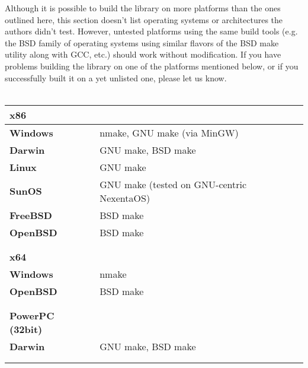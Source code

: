Although it is possible to build the  library on more platforms
than the ones outlined here, this section doesn't list operating systems or
architectures the authors didn't test. However, untested platforms using
the same build tools (e.g. the BSD family of operating systems using similar
flavors of the BSD make utility along with GCC, etc.) should work without
modification. If you have problems building the  library on one of the
platforms mentioned below, or if you successfully built it on a yet unlisted
one, please let us know.\\
\\

\begin{tabular}{l l}
{\bf{\large x86}} &                                           \\
\hline\hline
{\bf Windows}     & nmake, GNU make (via MinGW)               \\
{\bf Darwin}      & GNU make, BSD make                        \\
{\bf Linux}       & GNU make                                  \\
{\bf SunOS}       & GNU make (tested on GNU-centric NexentaOS)\\
{\bf FreeBSD}     & BSD make                                  \\
{\bf OpenBSD}     & BSD make                                  \\
\hline
                  &                                           \\
                  &                                           \\


{\bf{\large x64}} &                                           \\
\hline\hline
{\bf Windows}     & nmake                                     \\
{\bf OpenBSD}     & BSD make                                  \\
\hline
                  &                                           \\
                  &                                           \\


{\bf{\large PowerPC (32bit)}} &                               \\
\hline\hline
{\bf Darwin}                  & GNU make, BSD make            \\
\hline
                  &                                           \\
                  &                                           \\



\end{tabular}
